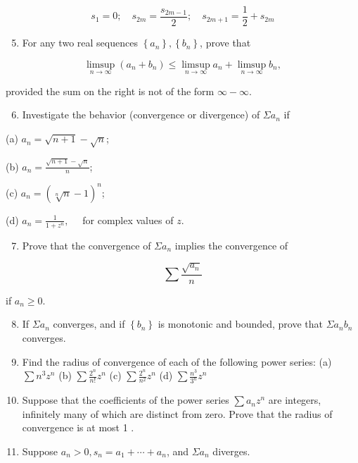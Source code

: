 \documentclass[10pt]{article}
\begin{document}
$$
s_{1}=0 ; \quad s_{2 m}=\frac{s_{2 m-1}}{2} ; \quad s_{2 m+1}=\frac{1}{2}+s_{2 m}
$$

\begin{enumerate}
  \setcounter{enumi}{4}
  \item For any two real sequences $\left\{a_{n}\right\},\left\{b_{n}\right\}$, prove that
\end{enumerate}

$$
\limsup _{n \rightarrow \infty}\left(a_{n}+b_{n}\right) \leq \limsup _{n \rightarrow \infty} a_{n}+\limsup _{n \rightarrow \infty} b_{n},
$$

provided the sum on the right is not of the form $\infty-\infty$.

\begin{enumerate}
  \setcounter{enumi}{5}
  \item Investigate the behavior (convergence or divergence) of $\Sigma a_{n}$ if
\end{enumerate}

(a) $a_{n}=\sqrt{n+1}-\sqrt{n}$;

(b) $a_{n}=\frac{\sqrt{n+1}-\sqrt{n}}{n}$;

(c) $a_{n}=(\sqrt[n]{n}-1)^{n}$;

(d) $a_{n}=\frac{1}{1+z^{n}}, \quad$ for complex values of $z$.

\begin{enumerate}
  \setcounter{enumi}{6}
  \item Prove that the convergence of $\Sigma a_{n}$ implies the convergence of
\end{enumerate}

$$
\sum \frac{\sqrt{a_{n}}}{n}
$$

if $a_{n} \geq 0$.

\begin{enumerate}
  \setcounter{enumi}{7}
  \item If $\Sigma a_{n}$ converges, and if $\left\{b_{n}\right\}$ is monotonic and bounded, prove that $\Sigma a_{n} b_{n}$ converges.

  \item Find the radius of convergence of each of the following power series:
(a) $\sum n^{3} z^{n}$
(b) $\sum \frac{2^{n}}{n !} z^{n}$
(c) $\sum \frac{2^{n}}{n^{2}} z^{n}$
(d) $\sum \frac{n^{3}}{3^{n}} z^{n}$

  \item Suppose that the coefficients of the power series $\sum a_{n} z^{n}$ are integers, infinitely many of which are distinct from zero. Prove that the radius of convergence is at most 1 .

  \item Suppose $a_{n}>0, s_{n}=a_{1}+\cdots+a_{n}$, and $\Sigma a_{n}$ diverges.

\end{enumerate}
\end{document}
